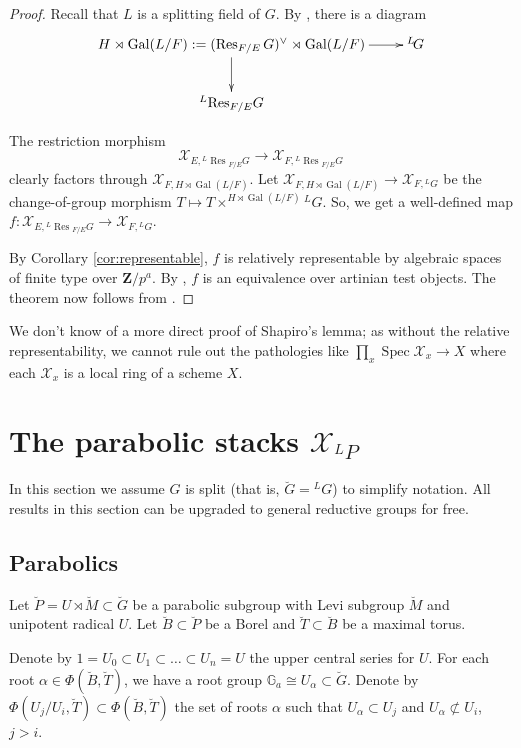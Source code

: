 \documentclass[11pt]{amsart}
\numberwithin{thm}{section}
\numberwithin{lem}{section}
\numberwithin{cor}{section}
\numberwithin{prop}{section}
\numberwithin{exam}{section}
\numberwithin{dfn}{section}
\newcommand{\Gal}{\operatorname{Gal}}
\newcommand{\Res}{\operatorname{Res}}
\newcommand{\spec}{\operatorname{Spec}}
\newcommand{\cX}{\mathcal{X}}
\newcommand{\G}{\mathbb{G}}
\newcommand{\bM}{\breve{M}}
\newcommand{\bP}{\breve{P}}
\newcommand{\bB}{\breve{B}}
\newcommand{\bT}{\breve{T}}
\newcommand{\bG}{\breve{G}}
\newcommand{\Z}{\mathbf{Z}}
\newcommand{\lsup}[2]{{^{#1}\!#2}}
\begin{document}
\begin{proof}
Recall that $L$ is a splitting field of $G$.
By \cite[2.1.5]{St10},
there is a diagram
\[
\xymatrix{
H\rtimes\Gal(L/F):=(\Res_{F/E}G)^{\vee}
\rtimes \Gal(L/F)
\ar[d]\ar[r]
&
\lsup LG 
\\
\lsup L\Res_{F/E}G
}
\]

The restriction morphism
\[
\cX_{E, \lsup L\Res_{F/E}G}
\to
\cX_{F, \lsup L\Res_{F/E}G}
\]
clearly
factors through
$\cX_{F, H\rtimes\Gal(L/F)}$.
Let
$\cX_{F, H\rtimes\Gal(L/F)}
\to \cX_{F, \lsup LG}$
be the change-of-group morphism
$T\mapsto T\times^{H\rtimes\Gal(L/F)}
\lsup LG$.
So, we get a well-defined map
$f:\cX_{E, \lsup L\Res_{F/E}G}
\to \cX_{F, \lsup LG}$.

By Corollary \ref{cor:representable},
$f$ is relatively representable
by algebraic spaces of finite type over $\Z/p^a$.
By \cite[Proposition 8]{St10},
$f$ is an equivalence over artinian test objects.
The theorem now follows from \cite[Lemma 7.2.5]{LLHLM}.
\end{proof}

We don't know of a more direct proof of Shapiro's lemma;
as without the relative representability,
we cannot rule out the pathologies like
$\prod_x \spec \cX_x \to X$
where each $\cX_x$ is a local ring of a scheme $X$.

\section{The parabolic stacks $\cX_{\lsup LP}$}


In this section we assume $G$ is split
(that is, $\bG=\lsup LG$)
to simplify notation.
All results in this section can
be upgraded to general reductive groups for free.


\subsection{Parabolics}
Let $\bP=U\rtimes\bM\subset \bG$ be a parabolic subgroup
with Levi subgroup $\bM$ and unipotent radical $U$.
Let $\bB\subset \bP$ be a Borel and
$\bT\subset \bB$ be a maximal torus.

Denote by $1=U_0\subset U_1\subset \dots\subset U_n=U$
the upper central series for $U$.
For each root $\alpha\in \Phi(\bB, \bT)$,
we have a root group $\G_a\cong U_\alpha\subset \bG$.
Denote by $\Phi(U_{j}/U_i, \bT)\subset \Phi(\bB, \bT)$
the set of roots $\alpha$
such that $U_\alpha \subset U_{j}$
and $U_\alpha\not\subset U_i$,
$j>i$.
\end{document}
